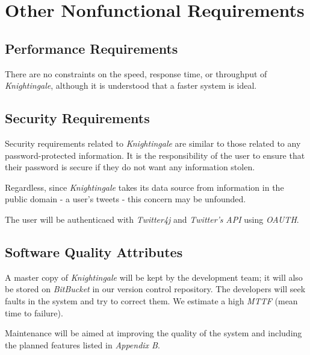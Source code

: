 \documentclass[a4paper, 12pt]{article}
\begin{document}
\section{Other Nonfunctional Requirements} \label{sec:nonfunc}
\subsection{Performance Requirements} \label{sec:performance}
\begin{adjustwidth}{2em}{0pt}
There are no constraints on the speed, response time, or throughput of \textit{Knightingale}, although it is understood that a faster system is ideal.
\end{adjustwidth}

\subsection{Security Requirements} \label{sec:security}
\begin{adjustwidth}{2em}{0pt}
Security requirements related to \textit{Knightingale} are similar to those related to any password-protected information. It is the responsibility of the user to ensure that their password is secure if they do not want any information stolen. \newline

\noindent Regardless, since \textit{Knightingale} takes its data source from information in the public domain - a user's tweets - this concern may be unfounded. \newline

\noindent The user will be authenticaed with \textit{Twitter4j} and \textit{Twitter's} \textit{API} using \textit{OAUTH}.
\end{adjustwidth} 

\subsection{Software Quality Attributes} \label{sec:quality}
\begin{adjustwidth}{2em}{0pt}
A master copy of \textit{Knightingale} will be kept by the development team; it will also be stored on \textit{BitBucket} in our version control repository. The developers will seek faults in the system and try to correct them. We estimate a high \textit{MTTF} (mean time to failure). \newline

\noindent Maintenance will be aimed at improving the quality of the system and including the planned features listed in \textit{Appendix B}.
\end{adjustwidth}
\end{document}
